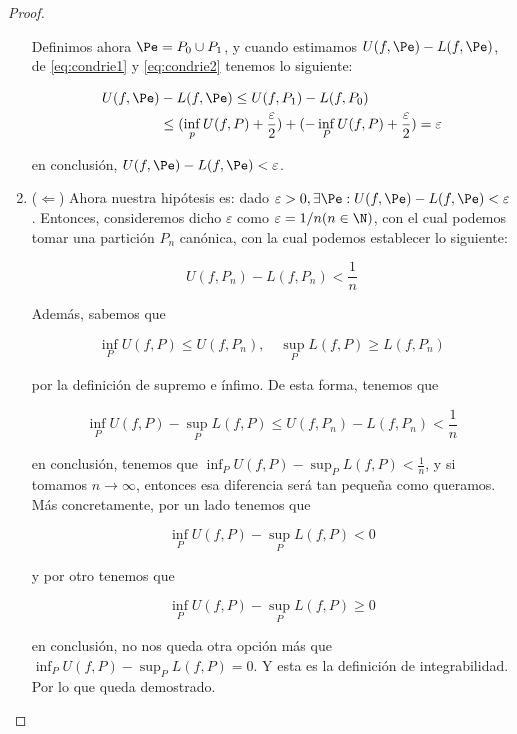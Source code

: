 \begin{proof}
\begin{enumerate}
        Definimos ahora $\Pe = P_0 \cup P_1$, y cuando estimamos $U(f, \Pe) - L(f,\Pe)$, de \ref{eq:condrie1} y \ref{eq:condrie2} tenemos lo siguiente:
        
        \begin{align*}
            U(f,\Pe) &- L(f,\Pe) \leq U(f,P_1) - L(f,P_0) \\
            &\leq (\inf_p U(f,P) + \frac{\varepsilon}{2}) + (-\inf_P U(f,P) + \frac{\varepsilon}{2}) = \varepsilon
        \end{align*}
        
        \noindent en conclusión, $U(f,\Pe) - L(f,\Pe) < \varepsilon$.
        
        \item ($\Leftarrow$) Ahora nuestra hipótesis es: dado $\varepsilon > 0, \exists \Pe: U(f, \Pe) - L(f, \Pe) < \varepsilon$. Entonces, consideremos dicho $\varepsilon$ como $\varepsilon = 1/n (n \in \N)$, con el cual podemos tomar una partición $P_n$ canónica, con la cual podemos establecer lo siguiente:
        
        \[
        U(f, P_n) - L(f, P_n) < \frac{1}{n}
        \]
        
        Además, sabemos que
        
        \[
        \inf_P U(f,P) \leq U(f,P_n), \quad \sup_P L(f,P) \geq L(f,P_n)
        \]
        
        \noindent por la definición de supremo e ínfimo. De esta forma, tenemos que
        
        \[
        \inf_P U(f,P) - \sup_P L(f,P) \leq U(f, P_n) - L(f, P_n) < \frac{1}{n}
        \]
        
        \noindent en conclusión, tenemos que $\inf_P U(f,P) - \sup_P L(f,P) < \frac{1}{n}$, y si tomamos $n \to \infty$, entonces esa diferencia será tan pequeña como queramos. Más concretamente, por un lado tenemos que
        
        \[
        \inf_P U(f,P) - \sup_P L(f,P) < 0
        \]
        
        \noindent y por otro tenemos que
        
        \[
        \inf_P U(f,P) - \sup_P L(f,P) \geq 0
        \]
        
        \noindent en conclusión, no nos queda otra opción más que $\inf_P U(f,P) - \sup_P L(f,P) = 0$. Y esta es la definición de integrabilidad. Por lo que queda demostrado.
    \end{enumerate}
\end{proof}

